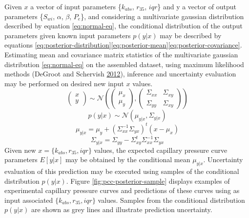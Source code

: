 \documentclass[english,msc,numbers]{coppe}
\begin{document}
  Given \(x\) a vector of input parameters \{\(k_{abs}\), \(r_{35}\), \(iqr\)\} and y a vector of output parameters \{\(S_{wi}\), \(\alpha\), \(\beta\), \(P_e\)\}, and considering a multivariate gaussian distribution described by equation \eqref{eq:normal-eq}, the conditional distribution of the output parameters given known input parameters \(p(y|x)\) may be described by equations \eqref{eq:posterior-distribution}\eqref{eq:posterior-mean}\eqref{eq:posterior-covariance}. Estimating mean and covariance matrix statistics of the multivariate gaussian distribution \eqref{eq:normal-eq} on the assembled dataset, using maximum likelihood methods (DeGroot and Schervish \protect\hyperlink{ref-DeGroot2012}{2012}), inference and uncertainty evaluation may be performed on desired new input \(x\) values.
  \begin{equation} 
    \begin{pmatrix}
    x \\
    y
    \end{pmatrix} \sim \mathcal{N}\left(\begin{pmatrix}
    \mu_x \\
    \mu_y
    \end{pmatrix},\begin{pmatrix}
    \Sigma_{xx} & \Sigma_{xy} \\
    \Sigma_{yy} & \Sigma_{xy}
    \end{pmatrix}\right)
    \label{eq:normal-eq}
  \end{equation}
  \begin{equation} 
    p(y|x) \sim \mathcal{N}(\mu_{y|x}, \Sigma_{y|x})
    \label{eq:posterior-distribution}
  \end{equation}
  \begin{equation} 
    \mu_{y|x} = \mu_y + (\Sigma_{xx}^{-1}\Sigma_{yx})^t(x-\mu_x)
    \label{eq:posterior-mean}
  \end{equation}
  \begin{equation} 
    \Sigma_{y|x} = \Sigma_{yy} - \Sigma_{xy}^{t}\Sigma_{xx}^{-1}\Sigma_{yx}
    \label{eq:posterior-covariance}
  \end{equation}
  Given new \(x=\{k_{abs}, r_{35}, iqr\}\) values, the expected capillary pressure curve parameters \(E[y|x]\) may be obtained by the conditional mean \(\mu_{y|x}\). Uncertainty evaluation of this prediction may be executed using samples of the conditional distribution \(p(y|x)\). Figure \ref{fig:pcc-posterior-sample} displays examples of experimental capillary pressure curves and predictions of these curves using as input associated \(\{k_{abs}, r_{35}, iqr\}\) values. Samples from the conditional distribution \(p(y|x)\) are shown as grey lines and illustrate prediction uncertainty.
\end{document}
